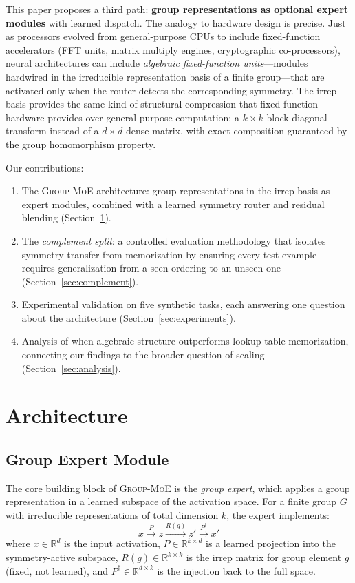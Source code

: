 \documentclass[10pt, letterpaper]{article}
\newcommand{\R}{\mathbb{R}}
\newcommand{\Rg}{R(g)}
\newcommand{\gmoe}{\textsc{Group-MoE}}
\begin{document}
This paper proposes a third path: \textbf{group representations as optional expert modules} with learned dispatch. The analogy to hardware design is precise. Just as processors evolved from general-purpose CPUs to include fixed-function accelerators (FFT units, matrix multiply engines, cryptographic co-processors), neural architectures can include \emph{algebraic fixed-function units}---modules hardwired in the irreducible representation basis of a finite group---that are activated only when the router detects the corresponding symmetry. The irrep basis provides the same kind of structural compression that fixed-function hardware provides over general-purpose computation: a $k \times k$ block-diagonal transform instead of a $d \times d$ dense matrix, with exact composition guaranteed by the group homomorphism property.

Our contributions:
\begin{enumerate}[leftmargin=*]
    \item The \gmoe{} architecture: group representations in the irrep basis as expert modules, combined with a learned symmetry router and residual blending (Section~\ref{sec:arch}).
    \item The \emph{complement split}: a controlled evaluation methodology that isolates symmetry transfer from memorization by ensuring every test example requires generalization from a seen ordering to an unseen one (Section~\ref{sec:complement}).
    \item Experimental validation on five synthetic tasks, each answering one question about the architecture (Section~\ref{sec:experiments}).
    \item Analysis of when algebraic structure outperforms lookup-table memorization, connecting our findings to the broader question of scaling (Section~\ref{sec:analysis}).
\end{enumerate}

\section{Architecture}
\label{sec:arch}

\subsection{Group Expert Module}

The core building block of \gmoe{} is the \emph{group expert}, which applies a group representation in a learned subspace of the activation space. For a finite group $G$ with irreducible representations of total dimension $k$, the expert implements:
\begin{equation}
    x \xrightarrow{P} z \xrightarrow{\Rg} z' \xrightarrow{P^\dagger} x'
    \label{eq:expert}
\end{equation}
where $x \in \R^d$ is the input activation, $P \in \R^{k \times d}$ is a learned projection into the symmetry-active subspace, $\Rg \in \R^{k \times k}$ is the irrep matrix for group element $g$ (fixed, not learned), and $P^\dagger \in \R^{d \times k}$ is the injection back to the full space.
\end{document}
